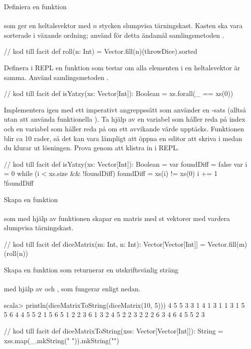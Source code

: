 \Subtask Definiera en funktion \\ \\ som ger en heltalsvektor med $n$ stycken slumpvisa tärningskast. Kasten ska vara sorterade i växande ordning; använd för detta ändamål samlingsmetoden .
\begin{Code}
// kod till facit
def roll(n: Int) = Vector.fill(n)(throwDice).sorted
\end{Code}


\Subtask Definera i REPL en funktion  som testar om alla elementen i en heltalsvektor är samma. Använd samlingsmetoden . 
\begin{Code}
// kod till facit
def isYatzy(xs: Vector[Int]): Boolean = xs.forall(_ == xs(0))
\end{Code}

\Subtask Implementera  igen med ett imperativt angreppssätt som använder en -sats (alltså utan att använda funktionella  ). Ta hjälp av en variabel  som håller reda på index och en variabel  som håller reda på om ett avvikande värde upptäcks. Funktionen blir ca 10 rader, så det kan vara lämpligt att öppna en editor att skriva i medan du klurar ut lösningen. Prova genom att klistra in i REPL. 
\begin{Code}
// kod till facit
def isYatzy(xs: Vector[Int]): Boolean = {
  var foundDiff = false
  var i = 0
  while (i < xs.size  && !foundDiff){
    foundDiff = xs(i) != xs(0)
    i += 1
  } 
  !foundDiff
}
\end{Code}


\Subtask Skapa en funktion  \\  \\ som med hjälp av funktionen  skapar en matris med  st vektorer med vardera  slumpvisa tärningskast.
\begin{Code}
// kod till facit
def diceMatrix(m: Int, n: Int): Vector[Vector[Int]] = 
  Vector.fill(m)(roll(n))
\end{Code}

\Subtask Skapa en funktion som returnerar en utskriftsvänlig sträng \\  \\med hjälp av  och , som fungerar enligt nedan. 
\begin{REPL}
scala> println(diceMatrixToString(diceMatrix(10, 5)))
4 5 5 3 3
1 4 1 3 1
1 3 1 5 5
6 4 4 5 5
2 1 5 6 5
1 2 2 3 6
1 3 2 4 5
2 2 3 2 2
2 6 3 4 6
4 5 5 2 3

\end{REPL}
\begin{Code}
// kod till facit
def diceMatrixToString(xss: Vector[Vector[Int]]): String = 
  xss.map(_.mkString(" ")).mkString("\n")
\end{Code}


